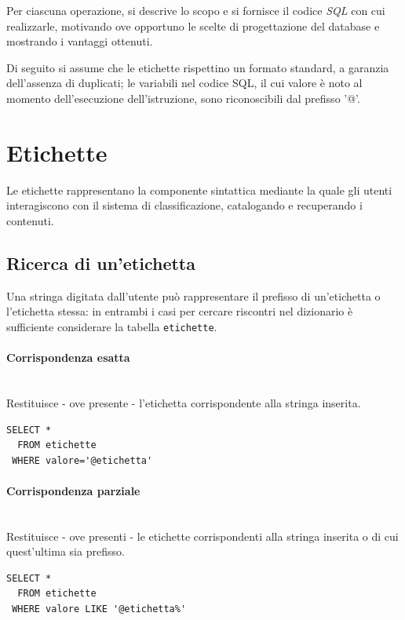 \documentclass[10pt,a4paper,headinclude,footinclude,hidelinks]{scrreprt} %
\begin{document}
	Per ciascuna operazione, si descrive lo scopo e si fornisce il codice \textit{SQL} con cui realizzarle, motivando ove opportuno le scelte di progettazione del database e mostrando i vantaggi ottenuti.

	Di seguito si assume che le etichette rispettino un formato standard, a garanzia dell'assenza di duplicati; le variabili nel codice SQL, il cui valore è noto al momento dell'esecuzione dell'istruzione, sono riconoscibili dal prefisso '@'.


	\section{Etichette}
	\label{ch:stage:er:operazioni:etichette}
	Le etichette rappresentano la componente sintattica mediante la quale gli utenti interagiscono con il sistema di classificazione, catalogando e recuperando i contenuti.

	\subsection{Ricerca di un'etichetta}
	\label{ch:stage:er:operazioni:etichette:ricerca}
	Una stringa digitata dall'utente può rappresentare il prefisso di un'etichetta o l'etichetta stessa: in entrambi i casi per cercare riscontri nel dizionario è sufficiente considerare la tabella \texttt{etichette}.

	\paragraph{Corrispondenza esatta} \hfill \\
	Restituisce - ove presente - l'etichetta corrispondente alla stringa inserita.

\begin{verbatim}
SELECT *
  FROM etichette
 WHERE valore='@etichetta'
\end{verbatim}

	\paragraph{Corrispondenza parziale} \hfill \\
	Restituisce - ove presenti - le etichette corrispondenti alla stringa inserita o di cui quest'ultima sia prefisso.

\begin{verbatim}
SELECT *
  FROM etichette	
 WHERE valore LIKE '@etichetta%'
\end{verbatim}
\end{document}
